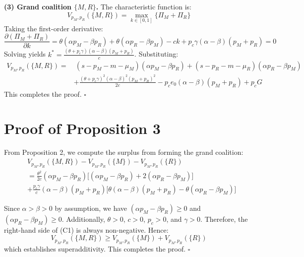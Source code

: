 \documentclass[authoryear,preprint,review,times,10pt]{elsarticle}
\begin{document}
\textbf{(3) Grand coalition $\{M,R\}$.} The characteristic function is:
\begin{equation}
V_{p_M,p_R}(\{M,R\}) = \max_{k \in [0,1]} \{\Pi_M + \Pi_R\}
\end{equation}
Taking the first-order derivative:
\begin{equation}
\frac{\partial (\Pi_M + \Pi_R)}{\partial k} = \theta(\alpha p_M - \beta p_R) + \theta(\alpha p_R - \beta p_M) - ck + p_c \gamma (\alpha - \beta)(p_M + p_R) = 0
\end{equation}
Solving yields $k^* = \frac{(\theta + p_c \gamma)(\alpha - \beta)(p_M + p_R)}{c}$. Substituting:
\begin{equation}
\begin{aligned}
V_{p_M,p_R}(\{M,R\}) =&\ (s - p_M - m - \mu_M)(\alpha p_M - \beta p_R) + (s - p_R - m - \mu_R)(\alpha p_R - \beta p_M) \\
&+ \frac{(\theta + p_c \gamma)^2(\alpha - \beta)^2(p_M + p_R)^2}{2c} - p_c e_0 (\alpha - \beta)(p_M + p_R) + p_c G
\end{aligned}
\tag{B3}
\end{equation}
This completes the proof. \hfill $\square$

\section{Proof of Proposition 3}

From Proposition 2, we compute the surplus from forming the grand coalition:
\begin{equation}
\begin{aligned}
& V_{p_M,p_R}(\{M,R\}) - V_{p_M,p_R}(\{M\}) - V_{p_M,p_R}(\{R\}) \\
&= \frac{\theta^2}{2c}(\alpha p_M - \beta p_R)\big[(\alpha p_M - \beta p_R) + 2(\alpha p_R - \beta p_M)\big] \\
&+ \frac{p_c \gamma}{c} (\alpha - \beta)(p_M + p_R) \big[\theta(\alpha - \beta)(p_M + p_R) - \theta(\alpha p_R - \beta p_M)\big]
\end{aligned}
\tag{C1}
\end{equation}

Since $\alpha > \beta > 0$ by assumption, we have $(\alpha p_M - \beta p_R) \geq 0$ and $(\alpha p_R - \beta p_M) \geq 0$. Additionally, $\theta > 0$, $c > 0$, $p_c > 0$, and $\gamma > 0$. Therefore, the right-hand side of (C1) is always non-negative. Hence:
\begin{equation}
V_{p_M,p_R}(\{M,R\}) \geq V_{p_M,p_R}(\{M\}) + V_{p_M,p_R}(\{R\})
\end{equation}
which establishes superadditivity. This completes the proof. \hfill $\square$
\end{document}

